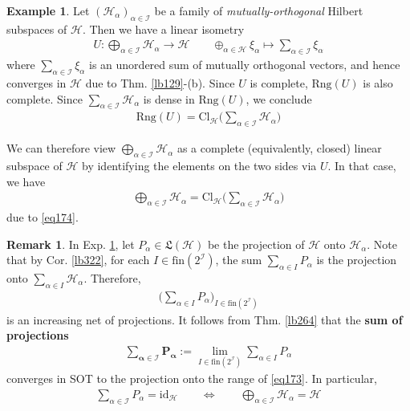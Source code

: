 \documentclass[12pt,b5paper,notitlepage]{article}
\theoremstyle{definition}
\newtheorem{eg}[df]{Example}
\newtheorem{rem}[df]{Remark}
\theoremstyle{plain}
\newcommand{\fk}{\mathfrak}
\newcommand{\id}{\mathrm{id}}
\newcommand{\Rng}{\mathrm{Rng}}
\newcommand{\fin}{\mathrm{fin}}
\newcommand{\Cl}{\mathrm{Cl}}
\newcommand{\MH}{\mathcal H}
\newcommand{\SI}{\mathscr I}
\newcommand{\hqed}{\hfill\qedsymbol}
\numberwithin{equation}{section}
\begin{document}
\begin{eg}\label{lb323}
Let $(\MH_\alpha)_{\alpha\in\SI}$ be a family of \textit{mutually-orthogonal} Hilbert subspaces of $\MH$. Then we have a linear isometry
\begin{align}\label{eq173}
U:\bigoplus_{\alpha\in\SI}\MH_\alpha\rightarrow\MH\qquad  \oplus_{\alpha\in\MH}\xi_\alpha\mapsto\sum_{\alpha\in\SI}\xi_\alpha
\end{align}
where $\sum_{\alpha\in\SI}\xi_\alpha$ is an unordered sum of mutually orthogonal vectors, and hence converges in $\MH$ due to Thm. \ref{lb129}-(b). Since $U$ is complete, $\Rng(U)$ is also complete. Since $\sum_{\alpha\in\SI}\MH_\alpha$ is dense in $\Rng(U)$, we conclude
\begin{align}\label{eq174}
\Rng(U)=\Cl_\MH\Big(\sum_{\alpha\in\SI}\MH_\alpha\Big)
\end{align}


We can therefore view $\bigoplus_{\alpha\in\SI}\MH_\alpha$ as a complete (equivalently, closed) linear subspace of $\MH$ by identifying the elements on the two sides via $U$. In that case, we have
\begin{align}\label{eq175}
\bigoplus_{\alpha\in\SI}\MH_\alpha=\Cl_\MH\Big(\sum_{\alpha\in\SI}\MH_\alpha\Big)
\end{align}
due to \eqref{eq174}.   \hqed
\end{eg}


\begin{rem}
In Exp. \ref{lb323}, let $P_\alpha\in\fk L(\MH)$ be the projection of $\MH$ onto $\MH_\alpha$. Note that by Cor. \ref{lb322}, for each $I\in\fin(2^\SI)$, the sum $\sum_{\alpha\in I}P_\alpha$ is the projection onto $\sum_{\alpha\in I}\MH_\alpha$. Therefore, 
\begin{align*}
\Big(\sum_{\alpha\in I}P_\alpha\Big)_{I\in\fin(2^\SI)}
\end{align*}
is an increasing net of projections. It follows from Thm. \ref{lb264} that the \textbf{sum of projections} 
\begin{gather*}
\pmb{\sum_{\alpha\in\SI}P_\alpha}:=\lim_{I\in\fin(2^\SI)}\sum_{\alpha\in I}P_\alpha
\end{gather*}
converges in SOT to the projection onto the range of \eqref{eq173}. In particular,
\begin{align*}
\sum_{\alpha\in\SI}P_\alpha=\id_\MH\qquad\Longleftrightarrow\qquad \bigoplus_{\alpha\in\SI}\MH_\alpha=\MH
\end{align*}
\end{rem}
\end{document}
